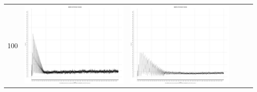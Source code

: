 \begin{table}[htbp]
{\begin{tabular}{l | ccccc}
		100	   & \begin{minipage}{.15\textwidth}\vspace{2pt}     							
     			 	\includegraphics[width=\linewidth]{images/mema-triple/I3}
    				 \end{minipage}
    			   & \begin{minipage}{.15\textwidth}\vspace{2pt}     							
     			 	\includegraphics[width=\linewidth]{images/mema-triple/I7}
    				 \end{minipage}
    			   &	 \begin{minipage}{.15\textwidth}\vspace{2pt}     							

\end{minipage}
\end{tabular}}
\end{table}
